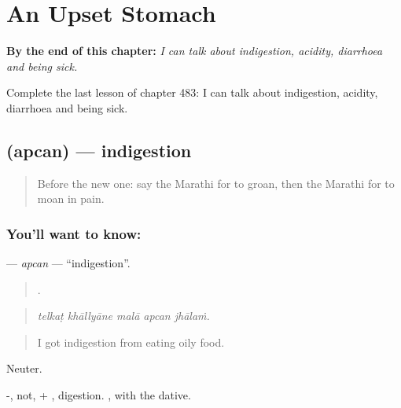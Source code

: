 
\chapter{An Upset Stomach}
\label{ch:mr-an-upset-stomach}

\begin{chapteropening}
\textbf{By the end of this chapter:} \emph{I can talk about indigestion, acidity, diarrhoea and being sick.}

Complete the last lesson of chapter 483: I can talk about indigestion, acidity, diarrhoea and being sick.
\end{chapteropening}

\section[\texorpdfstring{\mr{अपचन} (apcan)}{अपचन (apcan)}]{ (apcan) — indigestion}

\label{lesson:MR-C483-apcan}



\begin{quote}
Before the new one: say the Marathi for to groan, then the Marathi for to moan in pain.
\end{quote}

\subsection*{You'll want to know: }
\textbf{} — \emph{apcan} — \textquotedblleft{}indigestion\textquotedblright{}.

\begin{quote}
    .
\end{quote}

\begin{quote}
\emph{telkaṭ khāllyāne malā apcan jhālaṁ.}
\end{quote}

\begin{quote}
I got indigestion from eating oily food.
\end{quote}

Neuter.

-, not, + , digestion.  , with the dative.

